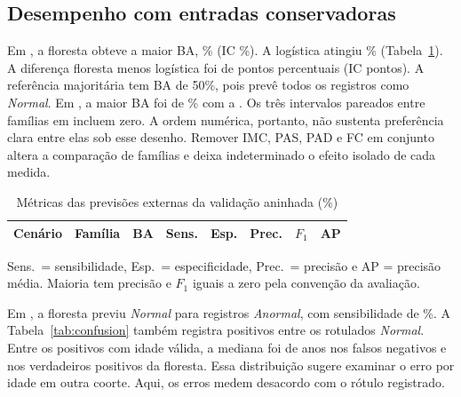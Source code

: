 \subsection{Desempenho com entradas conservadoras}
Em \fisio{}, a floresta obteve a maior BA, \FisioForestBA\% (IC \FisioForestCI\%). A logística atingiu \FisioLogisticBA\% (Tabela~\ref{tab:results}). A diferença floresta menos logística foi de \FisioDiffBA{} pontos percentuais (IC \FisioDiffCI{} pontos). A referência majoritária tem BA de 50\%, pois prevê todos os registros como \textit{Normal}. Em \strict{}, a maior BA foi de \StrictBestBA\% com a \StrictBestFamily{}. Os três intervalos pareados entre famílias em \strict{} incluem zero. A ordem numérica, portanto, não sustenta preferência clara entre elas sob esse desenho. Remover IMC, PAS, PAD e FC em conjunto altera a comparação de famílias e deixa indeterminado o efeito isolado de cada medida.

\begin{table}[!htbp]
\centering
\caption{Métricas das previsões externas da validação aninhada (\%)}
\label{tab:results}
\footnotesize
\setlength{\tabcolsep}{2.5pt}
\begin{tabular}{@{}llrrrrrr@{}}
\toprule
Cenário & Família & BA & Sens. & Esp. & Prec. & \(F_1\) & AP \\
\midrule

\end{tabular}
\par\smallskip
\raggedright\scriptsize Sens.\ = sensibilidade, Esp.\ = especificidade, Prec.\ = precisão e AP = precisão média. Maioria tem precisão e \(F_1\) iguais a zero pela convenção da avaliação.
\end{table}



Em \fisio{}, a floresta previu \textit{Normal} para \FisioForestFN{} registros \textit{Anormal}, com sensibilidade de \FisioForestSens\%. A Tabela~\ref{tab:confusion} também registra \FisioForestFP{} positivos entre os rotulados \textit{Normal}. Entre os positivos com idade válida, a mediana foi de \FisioMedianAgeFN{} anos nos falsos negativos e \FisioMedianAgeTP{} nos verdadeiros positivos da floresta. Essa distribuição sugere examinar o erro por idade em outra coorte. Aqui, os erros medem desacordo com o rótulo registrado.


